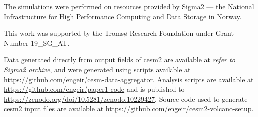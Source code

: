 \documentclass{ametsocV6.1}
\begin{document}
The simulations were performed on resources provided by Sigma2 --- the National
Infrastructure for High Performance Computing and Data Storage in Norway.

This work was supported by the Tromsø Research Foundation under Grant Number 19\_SG\_AT.

%
%
\datastatement{}

Data generated directly from output fields of \gls{cesm2} are available at \emph{refer
  to Sigma2 archive}, and were generated using scripts available at
\url{https://github.com/engeir/cesm-data-aggregator}. Analysis scripts are available at
\url{https://github.com/engeir/paper1-code} and is published to
\url{https://zenodo.org/doi/10.5281/zenodo.10229427}. Source code used to generate
\gls{cesm2} input files are available at
\url{https://github.com/engeir/cesm2-volcano-setup}.

%






%
\end{document}
